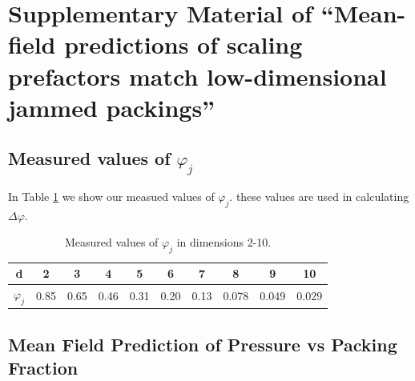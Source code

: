 
\section{Supplementary Material of ``Mean-field predictions of scaling prefactors match low-dimensional jammed packings''}
\author{James D Sartor, Sean A. Ridout, Eric I. Corwin}

\label{excessContactsScalingSupplement}

\subsection{Measured values of $\varphi_j$}
In Table \ref{table:phij} we show our measued values of $\varphi_j$. these values are used in calculating $\Delta \varphi$.

\begin{table}[ht]
\caption{Measured values of $\varphi_j$ in dimensions 2-10.
\label{table:phij}}
\begin{tabular}{ |c|c|c|c|c|c|c|c|c|c| } 
 \hline
 d & 2 & 3 & 4 & 5 & 6 & 7 & 8 & 9 & 10 \\ 
 \hline
 $\varphi_j$ & 0.85 & 0.65 & 0.46 & 0.31 & 0.20 & 0.13 & 0.078 & 0.049 & 0.029\\ 
 \hline
\end{tabular}
\end{table}

\subsection{Mean Field Prediction of Pressure vs Packing Fraction}

